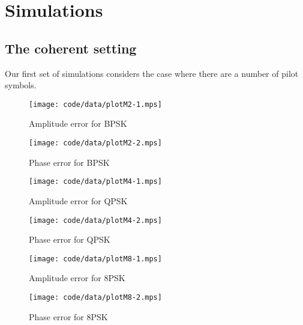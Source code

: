 \documentclass[journal]{IEEEtran}
\begin{document}
\section{Simulations}\label{sec:simulations}

\subsection{The coherent setting}

Our first set of simulations considers the case where there are a number of pilot symbols.

\begin{figure*}[tp]
	\centering
		\texttt{[image: code/data/plotM2-1.mps]}
		\caption{Amplitude error for BPSK}
		\label{fig:plotamp}
\end{figure*}


\begin{figure*}[tp]
	\centering
		\texttt{[image: code/data/plotM2-2.mps]}
		\caption{Phase error for BPSK}
		\label{fig:plotphase}
\end{figure*}


\begin{figure*}[tp]
	\centering
		\texttt{[image: code/data/plotM4-1.mps]}
		\caption{Amplitude error for QPSK}
		\label{fig:plotamp}
\end{figure*}


\begin{figure*}[tp]
	\centering
		\texttt{[image: code/data/plotM4-2.mps]}
		\caption{Phase error for QPSK}
		\label{fig:plotphase}
\end{figure*}


\begin{figure*}[tp]
	\centering
		\texttt{[image: code/data/plotM8-1.mps]}
		\caption{Amplitude error for 8PSK}
		\label{fig:plotamp}
\end{figure*}


\begin{figure*}[tp]
	\centering
		\texttt{[image: code/data/plotM8-2.mps]}
		\caption{Phase error for 8PSK}
		\label{fig:plotphase}
\end{figure*}
\end{document}
